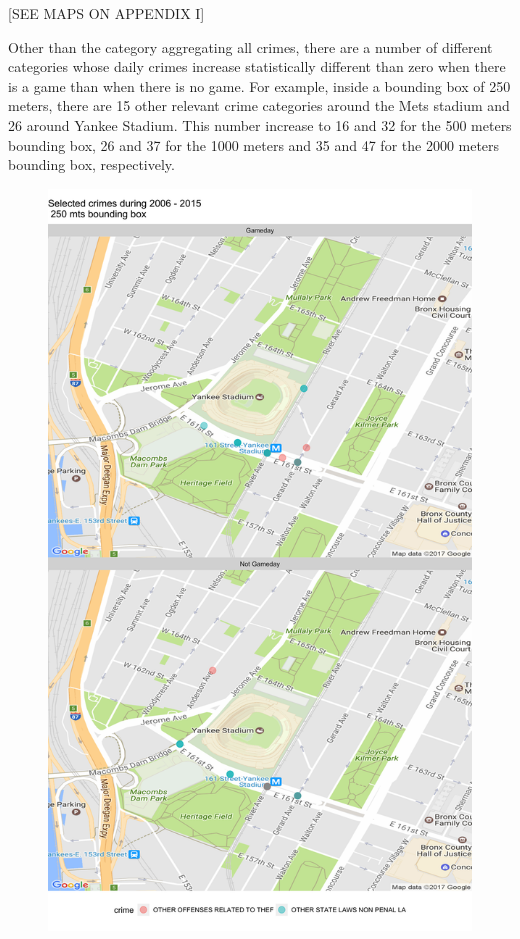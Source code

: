 \documentclass{article}
\begin{document}
\begin{center}
[SEE MAPS ON APPENDIX I]
\end{center}

Other than the category aggregating all crimes, there are a number of different categories whose daily crimes increase statistically different than zero when there is a game than when there is no game. For example, inside a bounding box of 250 meters, there are 15 other relevant crime categories around the Mets stadium and 26 around Yankee Stadium. This number increase to 16 and 32 for the 500 meters bounding box, 26 and 37 for the 1000 meters and 35 and 47 for the 2000 meters bounding box, respectively. 

\begin{figure}[H]
\centering
\includegraphics[scale=0.1]{9_YankeesOthers250mts.png}
\end{figure}
\end{document}

